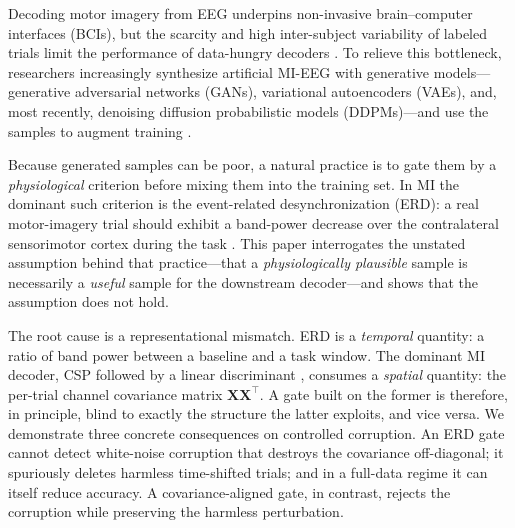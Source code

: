 \documentclass[conference]{IEEEtran}
\begin{document}
Decoding motor imagery from EEG underpins non-invasive brain--computer
interfaces (BCIs), but the scarcity and high inter-subject variability of
labeled trials limit the performance of data-hungry decoders
\cite{blankertz2008optimizing,schirrmeister2017deep,lawhern2018eegnet,fahimi2019inter}. To relieve
this bottleneck, researchers increasingly synthesize artificial MI-EEG with
generative models---generative adversarial networks (GANs), variational
autoencoders (VAEs), and, most recently, denoising diffusion probabilistic
models (DDPMs)---and use the samples to augment training
\cite{goodfellow2014generative,kingma2014auto,ho2020denoising,dhariwal2021diffusion,
song2021score,hartmann2018eeg,lashgari2020data,vetter2024generating,dere2025motor,li2026diffusion}.

Because generated samples can be poor, a natural practice is to gate them by a
\emph{physiological} criterion before mixing them into the training set. In MI
the dominant such criterion is the event-related desynchronization (ERD): a
real motor-imagery trial should exhibit a band-power decrease over the
contralateral sensorimotor cortex during the task
\cite{pfurtscheller1999event}. This paper interrogates the unstated assumption
behind that practice---that a \emph{physiologically plausible} sample is
necessarily a \emph{useful} sample for the downstream decoder---and shows that
the assumption does not hold.

The root cause is a representational mismatch. ERD is a \emph{temporal}
quantity: a ratio of band power between a baseline and a task window. The
dominant MI decoder, CSP followed by a linear discriminant
\cite{ramoser2000optimal,blankertz2008optimizing,lotte2018review}, consumes a
\emph{spatial} quantity: the per-trial channel covariance matrix
$\mathbf{X}\mathbf{X}^{\top}$. A gate built on the former is therefore, in
principle, blind to exactly the structure the latter exploits, and vice versa.
We demonstrate three concrete consequences on controlled corruption. An ERD gate
cannot detect white-noise corruption that destroys the covariance off-diagonal;
it spuriously deletes harmless time-shifted trials; and in a full-data regime it
can itself reduce accuracy. A covariance-aligned gate, in contrast, rejects the
corruption while preserving the harmless perturbation.
\end{document}
